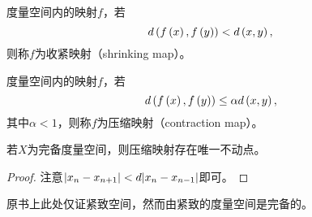\documentclass{ctexrep}
\begin{document}
  \begin{definition}
    度量空间内的映射$f$，若
    \[ d\left(f\left(x\right),f\left(y\right)\right) < d\left(x,y\right), \]
    则称$f$为收紧映射（shrinking map）。
  \end{definition}
    \begin{definition}
    度量空间内的映射$f$，若
    \[ d\left(f\left(x\right),f\left(y\right)\right) \le \alpha d\left(x,y\right), \]
    其中$\alpha < 1$，则称$f$为压缩映射（contraction map）。
  \end{definition}
  \begin{theorem}
    \label{thm:fixp0}
    若$X$为完备度量空间，则压缩映射存在唯一不动点。
  \end{theorem}
  \begin{proof}
    注意$\abs{x_n-x_{n+1}} < d\abs{x_{n}-x_{n-1}}$即可。
  \end{proof}
  原书上此处仅证紧致空间，然而由紧致的度量空间是完备的。
\end{document}
